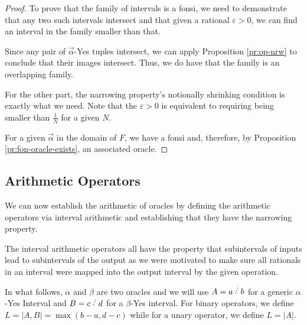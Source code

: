 \documentclass[12pt]{article}
\begin{document}
\begin{proof}
To prove that the family of intervals is a fonsi, we need to demonstrate that any two such intervals intersect and that given a rational $\varepsilon > 0$, we can find an interval in the family smaller than that. 

Since any pair of $\vec{\alpha}$-Yes tuples intersect, we can apply Proposition \ref{pr:op-nrw} to conclude that their images intersect. Thus, we do have that the family is an overlapping family. 

For the other part, the narrowing property's notionally shrinking condition is exactly what we need. Note that the $\varepsilon > 0$ is equivalent to requiring being smaller than $\frac{1}{N}$ for a given $N$.

For a given $\vec{\alpha}$ in the domain of $F$, we have a fonsi and, therefore, by Proposition \ref{pr:fon-oracle-exists}, an associated oracle.
\end{proof}


\subsection{Arithmetic Operators}

We can now establish the arithmetic of oracles by defining the arithmetic operators via interval arithmetic and establishing that they have the narrowing property.

The interval arithmetic operators all have the property that subintervals of inputs lead to subintervals of the output as we were motivated to make sure all rationals in an interval were mapped into the output interval by the given operation. 

In what follows, $\alpha$ and $\beta$ are two oracles and we will use $A=a\lte b$ for a generic $\alpha$-Yes Interval and $B=c\lte d$ for  a $\beta$-Yes interval. For binary operators, we define $L = |A,B| = \max(b-a, d-c)$ while for a unary operator, we define $L = |A|$. 
\end{document}
